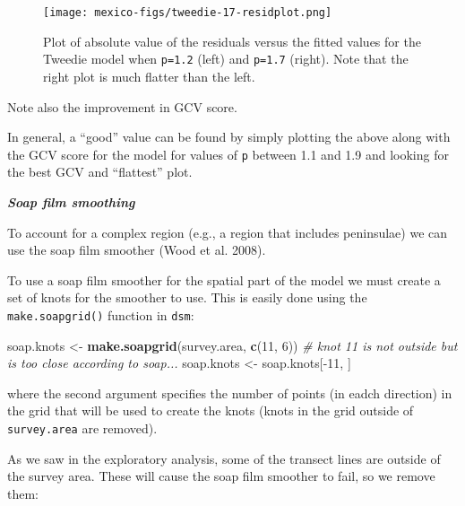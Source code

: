 \documentclass[]{amsart}
\newenvironment{Shaded}{}{}
\newcommand{\KeywordTok}[1]{\textcolor[rgb]{0.00,0.44,0.13}{\textbf{{#1}}}}
\newcommand{\DataTypeTok}[1]{\textcolor[rgb]{0.56,0.13,0.00}{{#1}}}
\newcommand{\DecValTok}[1]{\textcolor[rgb]{0.25,0.63,0.44}{{#1}}}
\newcommand{\StringTok}[1]{\textcolor[rgb]{0.25,0.44,0.63}{{#1}}}
\newcommand{\CommentTok}[1]{\textcolor[rgb]{0.38,0.63,0.69}{\textit{{#1}}}}
\newcommand{\NormalTok}[1]{{#1}}
\begin{document}
\begin{figure}[htbp]
\centering
\texttt{[image: mexico-figs/tweedie-17-residplot.png]}
\caption{Plot of absolute value of the residuals versus the fitted
values for the Tweedie model when \texttt{p=1.2} (left) and
\texttt{p=1.7} (right). Note that the right plot is much flatter than
the left.}
\end{figure}

Note also the improvement in GCV score.

In general, a ``good'' value can be found by simply plotting the above
along with the GCV score for the model for values of \texttt{p} between
1.1 and 1.9 and looking for the best GCV and ``flattest'' plot.

\textbf{\emph{Soap film smoothing}}

To account for a complex region (e.g., a region that includes
peninsulae) we can use the soap film smoother (Wood et al. 2008).

To use a soap film smoother for the spatial part of the model we must
create a set of knots for the smoother to use. This is easily done using
the \texttt{make.soapgrid()} function in \texttt{dsm}:

\begin{Shaded}
\begin{Highlighting}[]
\NormalTok{soap.knots <-}\StringTok{ }\KeywordTok{make.soapgrid}\NormalTok{(survey.area, }\KeywordTok{c}\NormalTok{(}\DecValTok{11}\NormalTok{, }\DecValTok{6}\NormalTok{))}
\CommentTok{# knot 11 is not outside but is too close according to soap...}
\NormalTok{soap.knots <-}\StringTok{ }\NormalTok{soap.knots[-}\DecValTok{11}\NormalTok{, ]}
\end{Highlighting}
\end{Shaded}

where the second argument specifies the number of points (in eadch
direction) in the grid that will be used to create the knots (knots in
the grid outside of \texttt{survey.area} are removed).

As we saw in the exploratory analysis, some of the transect lines are
outside of the survey area. These will cause the soap film smoother to
fail, so we remove them:

\begin{Shaded}
\end{Shaded}
\end{document}
